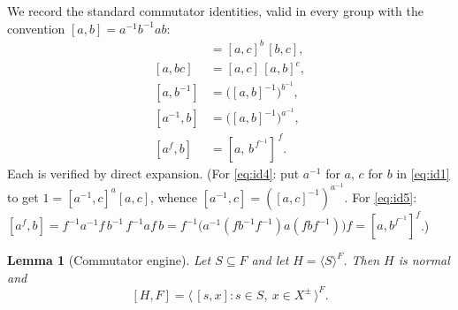 \documentclass{amsart}
\newtheorem{lemma}{Lemma}
\theoremstyle{definition}
\theoremstyle{remark}
\begin{document}
We record the standard commutator identities, valid in every group with the
convention $[a,b]=a^{-1}b^{-1}ab$:
\begin{align}
[ab,c]&=[a,c]^{b}\,[b,c], \label{eq:id1}\\
[a,bc]&=[a,c]\,[a,b]^{c}, \label{eq:id2}\\
[a,b^{-1}]&=\big([a,b]^{-1}\big)^{b^{-1}}, \label{eq:id3}\\
[a^{-1},b]&=\big([a,b]^{-1}\big)^{a^{-1}}, \label{eq:id4}\\
[a^{f},b]&=[a,\,b^{\,f^{-1}}]^{\,f}. \label{eq:id5}
\end{align}
Each is verified by direct expansion. (For \eqref{eq:id4}: put $a^{-1}$ for $a$,
$c$ for $b$ in \eqref{eq:id1} to get $1=[a^{-1},c]^{a}[a,c]$, whence
$[a^{-1},c]=([a,c]^{-1})^{a^{-1}}$. For \eqref{eq:id5}:
$[a^f,b]=f^{-1}a^{-1}f\,b^{-1}\,f^{-1}af\,b
=f^{-1}\big(a^{-1}(fb^{-1}f^{-1})a(fbf^{-1})\big)f=[a,b^{f^{-1}}]^{f}$.)

\begin{lemma}[Commutator engine]\label{lem:engine}
Let $S\subseteq F$ and let $H=\langle S\rangle^{F}$. Then $H$ is normal and
\begin{equation}\label{eq:engine}
[H,F]=\big\langle\,[s,x] : s\in S,\ x\in X^{\pm}\,\big\rangle^{F}.
\end{equation}
\end{lemma}
\end{document}
